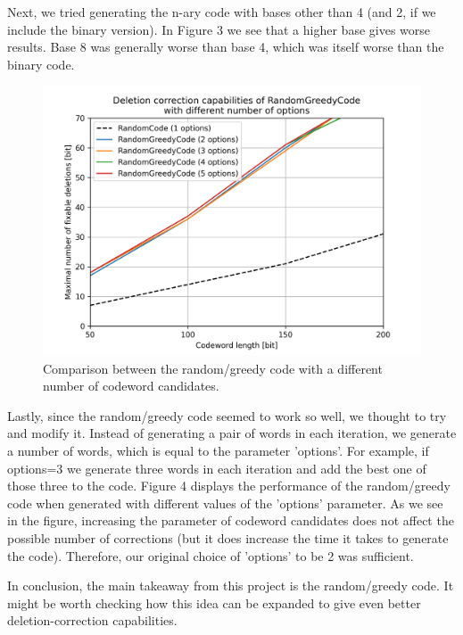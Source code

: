 \documentclass{article}
\begin{document}
\noindent Next, we tried generating the n-ary code with bases other than 4 (and 2, if we include the binary version). In Figure 3 we see that a higher base gives worse results. Base 8 was generally worse than base 4, which was itself worse than the binary code.

\begin{figure}[H]
    \centering
    \includegraphics[width=1\textwidth]{artifacts/figure4.png}
    \caption{Comparison between the random/greedy code with a different number of codeword candidates.}
\end{figure}

\noindent Lastly, since the random/greedy code seemed to work so well, we thought to try and modify it. Instead of generating a pair of words in each iteration, we generate a number of words, which is equal to the parameter 'options'. For example, if options=3 we generate three words in each iteration and add the best one of those three to the code. Figure 4 displays the performance of the random/greedy code when generated with different values of the 'options' parameter. As we see in the figure, increasing the parameter of codeword candidates does not affect the possible number of corrections (but it does increase the time it takes to generate the code). Therefore, our original choice of 'options' to be 2 was sufficient.

In conclusion, the main takeaway from this project is the random/greedy code. It might be worth checking how this idea can be expanded to give even better deletion-correction capabilities.

\clearpage


\end{document}
